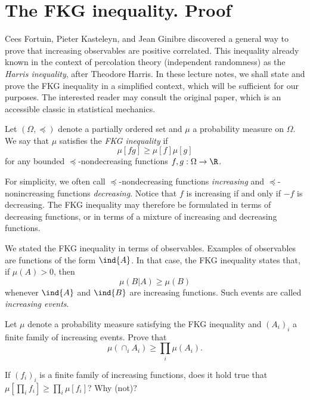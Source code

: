 \section{The FKG inequality. Proof}

Cees Fortuin, Pieter Kasteleyn, and Jean Ginibre discovered a general
way to prove that increasing observables are positive correlated.
This inequality already known in the context of percolation
theory (independent randomness) as the \emph{Harris inequality},
after Theodore Harris.
In these lecture notes, we shall state and prove the FKG inequality in a simplified
context, which will be sufficient for our purposes.
The interested reader may consult the original paper, which is an accessible classic in
statistical mechanics.

\begin{definition}
    Let $(\Omega,\preceq)$ denote a partially ordered set
    and $\mu$ a probability measure on $\Omega$.
    We say that $\mu$ satisfies the \emph{FKG inequality}
    if
    \begin{equation}
        \label{eq:FKG}
        \mu[fg]\geq \mu[f]\mu[g]
    \end{equation}
    for any bounded $\preceq$-nondecreasing functions
    $f,g:\Omega\to\R$.
\end{definition}

For simplicity, we often call $\preceq$-nondecreasing functions \emph{increasing}
and $\preceq$-nonincreasing functions \emph{decreasing}.
Notice that $f$ is increasing if and only if $-f$ is decreasing.
The FKG inequality may therefore be formulated in terms of decreasing functions,
or in terms of a mixture of increasing and decreasing functions.

\begin{remark}
    We stated the FKG inequality in terms of observables.
    Examples of observables are functions of the form $\ind{A}$.
    In that case, the FKG inequality states that, if $\mu(A)>0$,
    then
    \[
        \mu(B|A)\geq \mu(B)
    \]
    whenever $\ind{A}$ and $\ind{B}$ are increasing functions.
    Such events are called \emph{increasing events}.
\end{remark}

\begin{exercise}
    Let $\mu$ denote a probability measure satisfying the FKG inequality and
    $(A_i)_i$ a finite family of increasing events.
    Prove that
    \[
        \mu(\cap_i A_i)\geq \prod_i\mu(A_i).
    \]

    If $(f_i)_i$ is a finite family of increasing functions,
    does it hold true that $\mu[\prod_i f_i]\geq \prod_i \mu[f_i]$?
    Why (not)?
\end{exercise}

